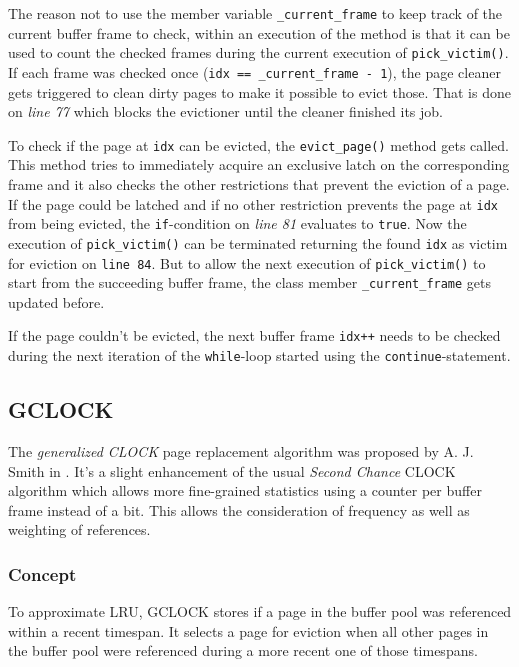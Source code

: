 	The reason not to use the member variable \lstinline{_current_frame} to keep track of the current buffer frame to check, within an execution of the method is that it can be used to count the checked frames during the current execution of \lstinline{pick_victim()}. If each frame was checked once (\lstinline{idx == _current_frame - 1}), the page cleaner gets triggered to clean dirty pages to make it possible to evict those. That is done on \emph{line 77} which blocks the evictioner until the cleaner finished its job.
	
	To check if the page at \lstinline{idx} can be evicted, the \lstinline{evict_page()} method gets called. This method tries to immediately acquire an exclusive latch on the corresponding frame and it also checks the other restrictions that prevent the eviction of a page. If the page could be latched and if no other restriction prevents the page at \lstinline{idx} from being evicted, the \lstinline{if}-condition on \emph{line 81} evaluates to \lstinline{true}. Now the execution of \lstinline{pick_victim()} can be terminated returning the found \lstinline{idx} as victim for eviction on \lstinline{line 84}. But to allow the next execution of \lstinline{pick_victim()} to start from the succeeding buffer frame, the class member \lstinline{_current_frame} gets updated before.
	
	If the page couldn't be evicted, the next buffer frame \lstinline{idx++} needs to be checked during the next iteration of the \lstinline{while}-loop started using the \lstinline{continue}-statement.

\subsection{GCLOCK} \label{subsec:gclock}

	The \emph{generalized CLOCK} page replacement algorithm was proposed by A. J. Smith in \cite{Smith:1978}. It's a slight enhancement of the usual \emph{Second Chance} CLOCK algorithm which allows more fine-grained statistics using a counter per buffer frame instead of a bit. This allows the consideration of frequency as well as weighting of references.

\subsubsection{Concept}

	To approximate LRU, GCLOCK stores if a page in the buffer pool was referenced within a recent timespan. It selects a page for eviction when all other pages in the buffer pool were referenced during a more recent one of those timespans.


